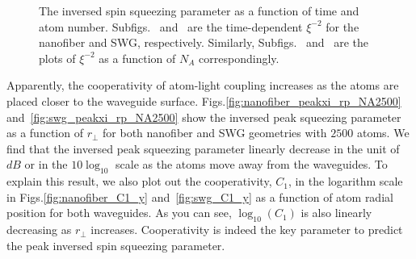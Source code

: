 \documentclass[preprint,aps,pra,onecolumn,superscriptaddress]{revtex4-1} %
\begin{document}
\begin{figure}[htb]
\centering
 \begin{minipage}[h]{0.95\linewidth}
    \hfill
   \end{minipage}\vfill
   \begin{minipage}[h]{0.95\linewidth}
       \hfill
   \end{minipage}
\caption{The inversed spin squeezing parameter as a function of time and atom number. Subfigs.~\protect{} and~\protect{} are the time-dependent $ \xi^{-2} $ for the nanofiber and SWG, respectively. Similarly, Subfigs.~\protect{} and~\protect{} are the plots of $ \xi^{-2} $ as a function of $ N_A $ correspondingly. }\label{fig:xi_rpfix_NA_t}
\end{figure}

Apparently, the cooperativity of atom-light coupling increases as the atoms are placed closer to the waveguide surface. Figs.\ref{fig:nanofiber_peakxi_rp_NA2500} and~\ref{fig:swg_peakxi_rp_NA2500} show the inversed peak squeezing parameter as a function of $ r\!_\perp $ for both nanofiber and SWG geometries with $2500$ atoms. We find that the inversed peak squeezing parameter linearly decrease in the unit of $ dB $ or in the $ 10\log_{10} $ scale as the atoms move away from the waveguides. To explain this result, we also plot out the cooperativity, $ C_1 $, in the logarithm scale in Figs.\ref{fig:nanofiber_C1_y} and~\ref{fig:swg_C1_y} as a function of atom radial position for both waveguides. As you can see, $ \log_{10}(C_1) $ is also linearly decreasing as $ r\!_\perp $ increases. Cooperativity is indeed the key parameter to predict the peak inversed spin squeezing parameter. 
\end{document}
